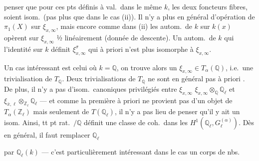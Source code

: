 \documentclass[11pt,a4paper]{article}
\begin{document}

penser que pour ces pts définis à val.\ dans le même $k$, les deux
foncteurs fibres, soient isom.\ (pas plus que dans le cas (ii)). Il n'y a
plus en général d'opération de $\pi_1(X)$ sur $\xi_{x,\infty}$, mais encore
comme dans (ii) les autom.\ de $k$ sur $k(x)$ opèrent sur $\xi_{x,\infty}$
½ linéairement (donnée de descente). Un autom.\ de $k$ qui \ill{}
l'identité sur $k$ définit $\xi_{x,\infty}^{\sigma}$ qui à priori n'est plus
isomorphe à $\xi_{x,\infty}$.

Un cas intéressant est celui où $k = \mathbb{Q}$, on trouve alors un
 $\xi_{x,\infty} \in T_\alpha(\mathbb{Q})$, i.e.\ une
trivialisation de $T_{\mathbb{Q}}$. Deux trivialisations \ill{} de
$T_{\mathbb{Q}}$ ne sont en général pas  à priori
. De plus, il n'y a pas d'isom.\ canoniques
privilégiés entre $\xi_{x,\infty}$ \ill{} $\xi_{x,\infty}
\otimes_{\mathbb{Q}} \mathbb{Q}_\ell$ et $\xi_{\bar{x},\ell}
\otimes_{\mathbb{Z}_\ell} \mathbb{Q}_\ell$ ---  et
comme la première à priori ne provient pas d'un objet de
$T_\alpha(\mathbb{Z}_\ell)$ mais seulement de $T(\mathbb{Q}_\ell)$, il n'y a
pas lieu de penser qu'il y ait un isom.
Ainsi, tt pt rat.\ $/\mathbb{Q}$ définit une classe de coh.\ dans les
$H^{1}(\mathbb{Q}_\ell, G_\ell^{(\alpha)})$. Dès \ill{} \struck{\ill{}} en
général, il faut remplacer $\mathbb{Q}_\ell$

par $\mathbb{Q}_\ell(k)$ --- c'est particulièrement intéressant dans le cas
\ill{} un corps de nbs.
\end{document}

